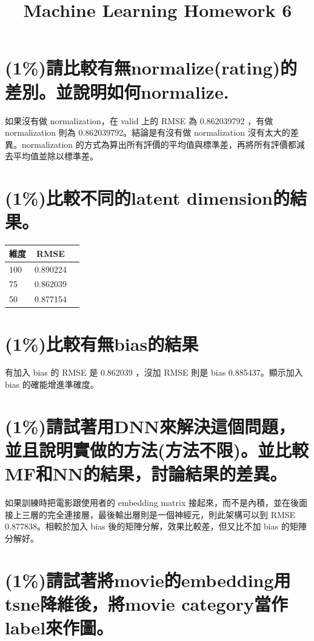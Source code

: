 \documentclass[fleqn,a4paper,12pt]{article}
\title{Machine Learning Homework 6}
\date{}
\begin{document}
\thispagestyle{fancy}

\section{(1\%)請比較有無normalize(rating)的差別。並說明如何normalize.}

如果沒有做 normalization，在 valid 上的 RMSE 為 0.862039792 ，有做 normalization 則為 0.862039792。結論是有沒有做 normalization 沒有太大的差異。normalization 的方式為算出所有評價的平均值與標準差，再將所有評價都減去平均值並除以標準差。

\section{(1\%)比較不同的latent dimension的結果。}

\begin{tabular}[c]{| l | c | r |}
  \hline
  維度 & RMSE \\ \hline
  100 & 0.890224 \\ \hline
  75 & 0.862039 \\ \hline
  50 & 0.877154 \\ \hline
\end{tabular}

\section{(1\%)比較有無bias的結果}

有加入 bias 的 RMSE 是 0.862039 ，沒加 RMSE 則是 bias 0.885437。顯示加入 bias 的確能增進準確度。

\section{(1\%)請試著用DNN來解決這個問題，並且說明實做的方法(方法不限)。並比較MF和NN的結果，討論結果的差異。}

如果訓練時把電影跟使用者的 embedding matrix 接起來，而不是內積，並在後面接上三層的完全連接層，最後輸出層則是一個神經元，則此架構可以到 RMSE 0.877838。相較於加入 bias 後的矩陣分解，效果比較差，但又比不加 bias 的矩陣分解好。

\section{(1\%)請試著將movie的embedding用tsne降維後，將movie category當作label來作圖。}
\end{document}
